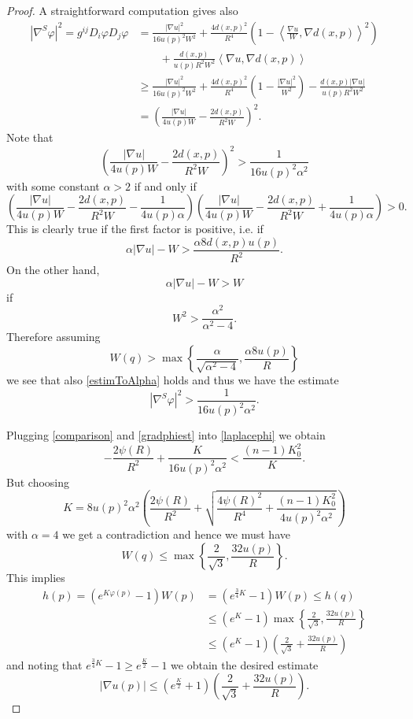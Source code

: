\documentclass[10pt,a4paper,reqno]{amsart}
\newcommand{\ang}[1]{\left\langle #1 \right\rangle}
\numberwithin{equation}{section}
\theoremstyle{plain}
\theoremstyle{definition}
\begin{document}
\begin{proof}
A straightforward computation gives also 
 	\begin{align*}
	|\nabla^S \varphi|^2 = g^{ij} D_i \varphi D_j \varphi &= 
	 \frac{|\nabla u|^2}{16 u(p)^2 W^2} + \frac{4d(x,p)^2}{R^4}\left(1- 
	 	\ang{\frac{\nabla u}{W},\nabla d(x,p)}^2 \right) \\
	 &\qquad +\frac{d(x,p)}{u(p)R^2W^2}\ang{\nabla u,\nabla d(x,p)} \\	
	&\ge \frac{|\nabla u|^2}{16 u(p)^2 W^2} + \frac{4d(x,p)^2}{R^4} \left( 1-\frac{|\nabla u|^2}{W^2} \right)
		-\frac{d(x,p)|\nabla u|}{u(p)R^2W^2} \\
	&= \left( \frac{|\nabla u|}{4u(p) W} - \frac{2d(x,p)}{R^2 W} \right)^2.
	\end{align*}   
Note that 
	\begin{equation}\label{estimToAlpha}
	\left( \frac{|\nabla u|}{4u(p) W} - \frac{2d(x,p)}{R^2 W} \right)^2 > \frac{1}{16 u(p)^2 \alpha^2}
	\end{equation}
with some constant $\alpha>2$ if and only if
	\[
	\left( \frac{|\nabla u|}{4u(p)W} -\frac{2d(x,p)}{R^2 W} -\frac{1}{4u(p)\alpha} \right) 
	\left( \frac{|\nabla u|}{4u(p)W} -\frac{2d(x,p)}{R^2 W} + \frac{1}{4u(p)\alpha} \right) > 0.
	\]
This is clearly true if the first factor is positive, i.e. if
	\[
	\alpha |\nabla u| - W > \frac{\alpha 8 d(x,p) u(p)}{R^2}.
	\]
On the other hand,
	\[
	\alpha |\nabla u| - W > W
	\]
if 
	\[
	W^2 > \frac{\alpha^2}{\alpha^2-4}.
	\]
Therefore assuming
	\begin{equation*}
	W(q) > \max\left\{ \frac{\alpha}{\sqrt{\alpha^2 -4}}, \frac{\alpha 8 u(p)}{R} \right\}
	\end{equation*}
we see that also \eqref{estimToAlpha} holds and thus 
 we have the estimate 
 \begin{equation}\label{gradphiest}
  |\nabla^S \varphi|^2 > \frac{1}{16u(p)^2\alpha^2}.
 \end{equation}   
    
 Plugging \eqref{comparison} and \eqref{gradphiest} into \eqref{laplacephi} we obtain
 	\[
	-\frac{2\psi(R)}{R^2} + \frac{K}{16 u(p)^2 \alpha^2} < \frac{(n-1)K_0^2}{K}.
	\]
  But choosing 
  	\begin{equation}\label{Kchoose}
 K =  8u(p)^2\alpha^2 \left( \frac{2\psi(R)}{R^2} + \sqrt{\frac{4\psi(R)^2}{R^4} 
	+\frac{(n-1)K_0^2}{4u(p)^2\alpha^2}} \right) 	
  	\end{equation}
	with $\alpha = 4$
  we get a contradiction and hence we must have
	\[
 	W(q) \le \max\left\{ \frac{2}{\sqrt{3}}, \frac{32 u(p)}{R} \right\}.
 	\]
  This implies 
  	\begin{align*}
	h(p) = (e^{K\varphi(p)} -1) W(p) &= (e^{\frac{3}{4}K} -1)W(p) \le h(q) \\
		&\le (e^K - 1) 
	\max\left\{ \frac{2}{\sqrt{3}}, \frac{32 u(p)}{R} \right\} \\
	&\le (e^K-1)\left(\frac{2}{\sqrt{3}}+\frac{32 u(p)}{R}\right)
	\end{align*}
  and noting that $e^{\frac{3}{4}K} -1 \ge e^{\frac{K}{2}} -1$
  we obtain the desired estimate 
  \[
  |\nabla u(p)| \le (e^{\frac{K}{2}}+1)\left(\frac{2}{\sqrt{3}}+\frac{32 u(p)}{R}\right).
  \]
      \end{proof}
\end{document}
